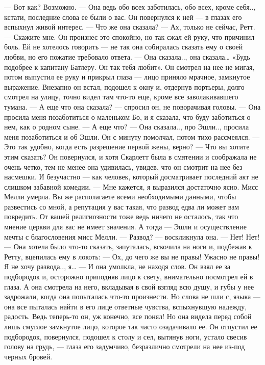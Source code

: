 — Вот как? Возможно.
— Она ведь обо всех заботилась, обо всех, кроме себя.., кстати, последние слова ее были о вас.
Он повернулся к ней — в глазах его вспыхнул живой интерес.
— Что же она сказала?
— Ах, только не сейчас, Ретт.
— Скажите мне.
Он произнес это спокойно, но так сжал ей руку, что причинил боль. Ей не хотелось говорить — не так она собиралась сказать ему о своей любви, но его пожатие требовало ответа.
— Она сказала.., она сказала… «Будь подобрее к капитану Батлеру. Он так тебя любит».
Он смотрел на нее не мигая, потом выпустил ее руку и прикрыл глаза — лицо приняло мрачное, замкнутое выражение. Внезапно он встал, подошел к окну и, отдернув портьеры, долго смотрел на улицу, точно видел там что-то еще, кроме все заволакивавшего тумана.
— А еще что она сказала? — спросил он, не поворачивая головы.
— Она просила меня позаботиться о маленьком Бо, и я сказала, что буду заботиться о нем, как о родном сыне.
— А еще что?
— Она сказала.., про Эшли.., просила меня позаботиться и об Эшли.
Он с минуту помолчал, потом тихо рассмеялся.
— Это так удобно, когда есть разрешение первой жены, верно?
— Что вы хотите этим сказать?
Он повернулся, и хотя Скарлетт была в смятении и соображала не очень четко, тем не менее она удивилась, увидев, что он смотрит на нее без насмешки. И безучастно — как человек, который досматривает последний акт не слишком забавной комедии.
— Мне кажется, я выразился достаточно ясно. Мисс Мелли умерла. Вы же располагаете всеми необходимыми данными, чтобы развестись со мной, а репутация у вас такая, что развод едва ли может вам повредить. От вашей религиозности тоже ведь ничего не осталось, так что мнение церкви для вас не имеет значения. А тогда — Эшли и осуществление мечты с благословения мисс Мелли.
— Развод? — воскликнула она. — Нет! Нет! — Она хотела было что-то сказать, запуталась, вскочила на ноги и, подбежав к Ретту, вцепилась ему в локоть: — Ох, до чего же вы не правы! Ужасно не правы! Я не хочу развода.., я… — И она умолкла, не находя слов. Он взял ее за подбородок и, осторожно приподняв лицо к свету, внимательно посмотрел ей в глаза. А она смотрела на него, вкладывая в свой взгляд всю душу, и губы у нее задрожали, когда она попыталась что-то произнести. Но слова не шли с, языка — она все пыталась найти в его лице ответные чувства, вспыхнувшую надежду, радость. Ведь теперь-то он, уж конечно, все понял! Но она видела перед собой лишь смуглое замкнутое лицо, которое так часто озадачивало ее. Он отпустил ее подбородок, повернулся, подошел к столу и сел, вытянув ноги, устало свесив голову на грудь, — глаза его задумчиво, безразлично смотрели на нее из-под черных бровей.
